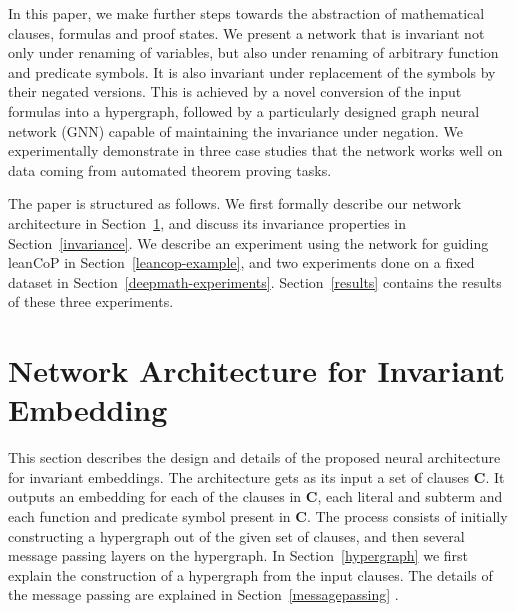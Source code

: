 \documentclass{ecai}
\def\systemname#1{\textsf{#1}\xspace}
\newcommand{\lc}{\systemname{leanCoP}}
\begin{document}
In this paper, we make further steps towards the abstraction of
mathematical clauses, formulas and proof states. We present a network that is invariant not only
under renaming of variables, but also under renaming of arbitrary function and predicate
symbols. It is also invariant under replacement of the symbols by their negated versions.
This is achieved by a novel conversion of the input formulas into a hypergraph, followed by a 
particularly designed 
graph neural network (GNN) capable of maintaining the invariance under negation. 
We experimentally demonstrate in three case studies
that the network works well on data 
coming from automated theorem proving tasks.


The paper is structured as follows. We first formally describe our network architecture in
Section~\ref{architecture}, and discuss its invariance properties
in Section~\ref{invariance}. We describe an experiment using the
network for guiding \lc in Section~\ref{leancop-example}, and
two experiments done on a fixed dataset in
Section~\ref{deepmath-experiments}. Section~\ref{results} contains the
results of these three experiments.

\section{Network Architecture for Invariant Embedding}
\label{architecture}

This section describes the design and details of the proposed neural architecture for invariant embeddings.
 The architecture gets as its input a set of clauses $\mathbf C$. 
It outputs an embedding for each of the clauses in $\mathbf C$, each literal and subterm and each function and predicate
symbol present in $\mathbf C$. The process consists of initially
constructing a hypergraph out of the given set of clauses, and then
several message passing layers on the hypergraph. In Section~\ref{hypergraph} we first explain the construction of a hypergraph from the input clauses. The details of the message passing are explained in Section~\ref{messagepassing}
.
\end{document}
